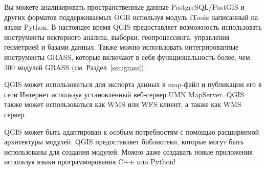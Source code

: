 
Вы можете анализировать пространственные данные PostgreSQL/PostGIS и
других форматов поддерживаемых OGR используя модуль fTools написанный на
языке Python. В настоящее время QGIS предоставляет возможность
использовать инструменты векторного анализа, выборки, геопроцессинга,
управления геометрией и базами данных. Также можно использовать
интегрированные инструменты GRASS, которые включают в себя
функциональность более, чем 300 модулей GRASS (см. Раздел~\ref{sec:grass}).


QGIS может использоваться для экспорта данных в map-файл и публикации
его в сети Интернет используя установленный веб-сервер UMN MapServer.
QGIS также может использоваться как WMS или WFS клиент, а также как WMS
сервер.


QGIS может быть адаптирован к особым потребностям с помощью расширяемой
архитектуры модулей. QGIS предоставляет библиотеки, которые могут быть
использованы для создания модулей. Можно даже создавать новые приложения
используя языки программирования C++ или Python!


